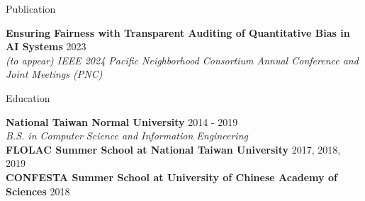 \documentclass{resume} %
\begin{document}

\begin{rSection}{Publication}

{\bf Ensuring Fairness with Transparent Auditing of Quantitative Bias in AI Systems} \hfill {2023} \\
{\em (to appear) IEEE 2024 Pacific Neighborhood Consortium Annual Conference and Joint Meetings (PNC)}

\end{rSection}

\begin{rSection}{Education}

{\bf National Taiwan Normal University} \hfill {2014 - 2019} \\
{\em B.S. in Computer Science and Information Engineering} \\
{\bf FLOLAC Summer School at National Taiwan University} \hfill {2017, 2018, 2019} \\
{\bf CONFESTA Summer School at University of Chinese Academy of Sciences} \hfill {2018}

\end{rSection}

\end{document}
